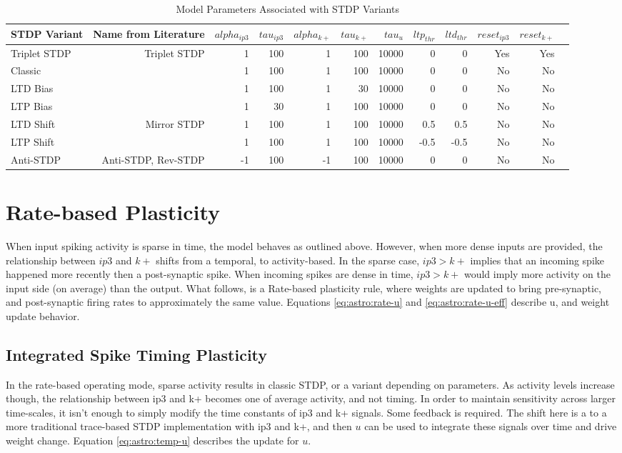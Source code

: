    \begin{table}[!htp]\centering
      \caption{Model Parameters Associated with STDP Variants} \label{table:astro_varient_params}
      \scriptsize
      \begin{tabular}{lrrrrrrrrrrr}\toprule
        STDP Variant &Name from Literature &$alpha_{ip3}$ &$tau_{ip3}$ &$alpha_{k+}$ &$tau_{k+}$ &$tau_u$ &$ltp_{thr}$ &$ltd_{thr}$ &$reset_{ip3}$ &$reset_{k+}$ \\\midrule
        Triplet STDP &Triplet STDP &1 &100 &1 &100 &10000 &0 &0 &Yes &Yes \\
        Classic & &1 &100 &1 &100 &10000 &0 &0 &No &No \\
        LTD Bias & &1 &100 &1 &30 &10000 &0 &0 &No &No \\
        LTP Bias & &1 &30 &1 &100 &10000 &0 &0 &No &No \\
        LTD Shift &Mirror STDP &1 &100 &1 &100 &10000 &0.5 &0.5 &No &No \\
        LTP Shift & &1 &100 &1 &100 &10000 &-0.5 &-0.5 &No &No \\
        Anti-STDP &Anti-STDP, Rev-STDP &-1 &100 &-1 &100 &10000 &0 &0 &No &No \\
        \bottomrule
      \end{tabular}
    \end{table}
    
    
    \section{Rate-based Plasticity}

    When input spiking activity is sparse in time, the model behaves as outlined
    above. However, when more dense inputs are provided, the relationship
    between $ip3$ and $k+$ shifts from a temporal, to activity-based. In the
    sparse case, $ip3 > k+$ implies that an incoming spike happened more
    recently then a post-synaptic spike. When incoming spikes are dense in time,
    $ip3 > k+$ would imply more activity on the input side (on average) than the
    output. What follows, is a Rate-based plasticity rule, where weights are
    updated to bring pre-synaptic, and post-synaptic firing rates to
    approximately the same value. Equations \ref{eq:astro:rate-u} and
    \ref{eq:astro:rate-u-eff} describe u, and weight update behavior.
 
    \subsection{Integrated Spike Timing Plasticity}
    In the rate-based operating mode, sparse activity results in classic STDP,
    or a variant depending on parameters. As activity levels increase though,
    the relationship between ip3 and k+ becomes one of average activity, and not
    timing. In order to maintain sensitivity across larger time-scales, it isn't
    enough to simply modify the time constants of ip3 and k+ signals. Some
    feedback is required. The shift here is a to a more traditional trace-based
    STDP implementation with ip3 and k+, and then $u$ can be used to integrate
    these signals over time and drive weight change. Equation
    \ref{eq:astro:temp-u} describes the update for $u$.

